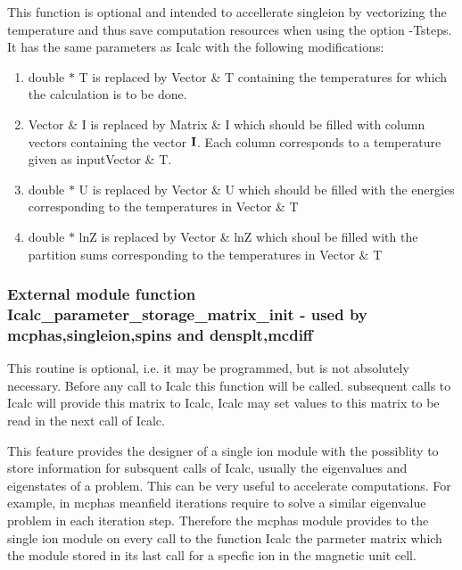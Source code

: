 This function is optional and intended to accellerate {\prg singleion} by vectorizing the temperature and
thus save computation resources when using the option {\prg -Tsteps}. It has the same parameters as 
{\prg Icalc} with the following modifications:

\begin{enumerate}
\item  {\prg double $\ast$ T} is replaced by {\prg Vector \& T} containing the temperatures for which 
the calculation is to be done.
\item {\prg Vector \& I } is replaced by {\prg Matrix \& I} which should be filled with column
vectors containing the vector $\mathbf I$. Each column corresponds to a temperature given as input{\prg Vector \& T}.
\item {\prg double $\ast$ U} is replaced by {\prg Vector \& U} which should be filled with
 the energies corresponding
to the temperatures in {\prg Vector \& T}
\item {\prg double $\ast$ lnZ} is replaced by {\prg Vector \& lnZ} which shoul be filled with the partition sums corresponding
to the temperatures in {\prg Vector \& T}
 
\end{enumerate}



\subsubsection{External module function {\prg Icalc\_parameter\_storage\_matrix\_init} - used by {\prg %
mcphas},{\prg singleion},{\prg spins} and {\prg %
densplt},{\prg mcdiff}  }

This routine is optional, i.e. it may be programmed, but is not absolutely necessary.
Before any call to Icalc this function will be called. subsequent calls to Icalc will provide this matrix to %
Icalc, Icalc may set values to this matrix to be read in the next call
of Icalc.

This feature provides the designer of a single ion module  with the possiblity to store information for subsquent %
calls of Icalc,
 usually the eigenvalues and eigenstates of a problem. This can be very useful to accelerate computations. For %
example, in {\prg mcphas} meanfield iterations require
to solve a similar eigenvalue problem in each iteration step. Therefore the {\prg mcphas} module provides
to the single ion module on every call to the function {\prg Icalc} the parmeter matrix {\prg }
which the module stored in its last call for a specfic ion in the magnetic unit cell.

